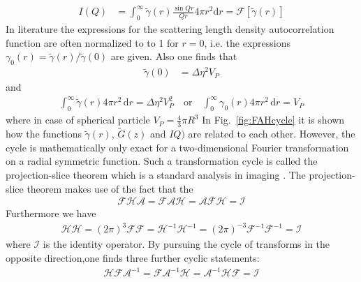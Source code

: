 \begin{align}
I(Q) &= \int_0^\infty \tilde{\gamma}(r) \frac{\sin Qr}{Qr}4\pi r^2\mathrm{d}r = \mathcal{F}\left[\tilde{\gamma}(r)\right]
\end{align}
In literature the expressions for the scattering length density autocorrelation function are often normalized to to 1 for $r=0$, i.e. the expressions $\gamma_0(r)=\tilde{\gamma}(r)/\tilde{\gamma}(0)$ are given. Also one finds that
\begin{align}
\tilde{\gamma}(0)&=\Delta\eta^2 V_P
\end{align}
and
\begin{align}
\int_0^\infty \tilde{\gamma}(r) 4\pi r^2 \, \mathrm{d}r =\Delta\eta^2 V_P^2 \quad \mbox{or} \quad  \int_0^\infty \gamma_0(r) 4\pi r^2 \, \mathrm{d}r = V_P
\end{align}
where in case of spherical particle $V_P=\frac43 \pi R^3$
In Fig.\ \ref{fig:FAHcycle} it is shown how the functions $\tilde{\gamma}(r)$, $\tilde{G}(z)$ and $IQ)$ are related to each other. However, the cycle is mathematically only exact for a two-dimensional Fourier transformation on a radial symmetric function.
Such a transformation cycle is called the projection-slice theorem which is a standard analysis in imaging \cite{Bracewell2003}. The projection-slice theorem makes use of the fact that the
\begin{align}
\mathcal{F}\mathcal{H}\mathcal{A}=\mathcal{F}\mathcal{A}\mathcal{H}=\mathcal{A}\mathcal{F}\mathcal{H}=\mathcal{I}
\end{align}
Furthermore we have
\begin{align}
\mathcal{HH}=(2\pi)^3\mathcal{FF}=\mathcal{H}^{-1}\mathcal{H}^{-1}=(2\pi)^{-3}\mathcal{F}^{-1}\mathcal{F}^{-1}=\mathcal{I}
\end{align}
where $\mathcal{I}$ is the identity operator.
By pursuing the cycle of transforms in the opposite direction,one finds three further cyclic statements:
\begin{align}
\mathcal{HF}\mathcal{A}^{-1}=\mathcal{F}\mathcal{A}^{-1}\mathcal{H}=\mathcal{A}^{-1}\mathcal{HF}=\mathcal{I}
\end{align}

